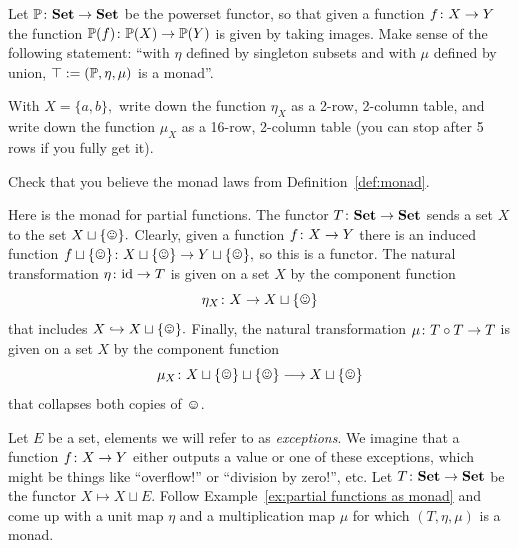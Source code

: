 \documentclass[CT4S-EN-RU]{subfiles}
\begin{document}
\begin{exampleRUS}\label{ex:monad}
\end{exampleRUS}

\begin{exerciseENG}\label{exc:power set monad}
Let ${\mathbb P}\colon{\mathbf{Set}}\rightarrow{\mathbf{Set}}$ be the powerset functor, so that given a function $f\colon X\rightarrow Y$ the function ${\mathbb P}(f)\colon{\mathbb P}(X)\rightarrow{\mathbb P}(Y)$ is given by taking images.
\sexc Make sense of the following statement: “with $\eta$ defined by singleton subsets and with $\mu$ defined by union, $\top:=({\mathbb P},\eta,\mu)$ is a monad”.
\item  With $X=\{a,b\},$ write down the function $\eta_X$ as a 2-row, 2-column table, and write down the function $\mu_X$ as a 16-row, 2-column table (you can stop after 5 rows if you fully get it).
\item Check that you believe the monad laws from Definition~\ref{def:monad}.
\endsexc
\end{exerciseENG}

\begin{exerciseRUS}\label{exc:power set monad}
\end{exerciseRUS}

\begin{exampleENG}\label{ex:partial functions as monad}
Here is the monad for partial functions. The functor $T\colon{\mathbf{Set}}\rightarrow{\mathbf{Set}}$ sends a set $X$ to the set $X\sqcup\singleton.$ Clearly, given a function $f\colon X\rightarrow Y$ there is an induced function $f\sqcup\singleton\taking X\sqcup\singleton\to Y\sqcup\singleton,$ so this is a functor. The natural transformation $\eta\colon\textnormal{id}\rightarrow T$ is given on a set $X$ by the component function $$\eta_X\taking X\to X\sqcup\singleton$$ that includes $X\inj X\sqcup\singleton.$ Finally, the natural transformation $\mu\colon T\circ T\rightarrow T$ is given on a set $X$ by the component function $$\mu_X\taking X\sqcup\singleton\sqcup\singleton\too X\sqcup\singleton$$ that collapses both copies of $\smiley.$
\end{exampleENG}

\begin{exampleRUS}\label{ex:partial functions as monad}
\end{exampleRUS}

\begin{exerciseENG}\label{exc:exceptions}
Let $E$ be a set, elements we will refer to as {\em exceptions}. We imagine that a function $f\colon X\rightarrow Y$ either outputs a value or one of these exceptions, which might be things like “overflow!” or “division by zero!”, etc. Let $T\colon{\mathbf{Set}}\rightarrow{\mathbf{Set}}$ be the functor $X\mapsto X\sqcup E.$ Follow Example~\ref{ex:partial functions as monad} and come up with a unit map $\eta$ and a multiplication map $\mu$ for which $(T,\eta,\mu)$ is a monad.
\end{exerciseENG}
\end{document}
